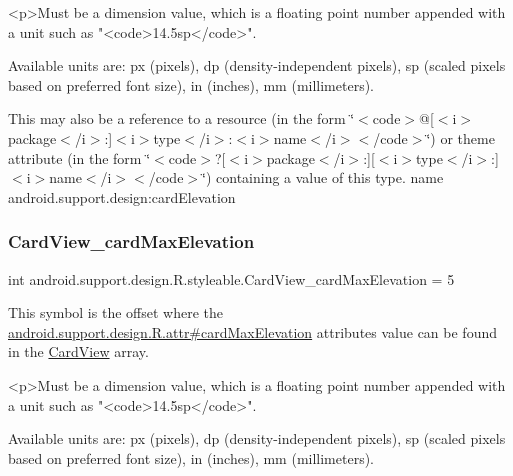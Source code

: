 \begin{DoxyVerb}      <p>Must be a dimension value, which is a floating point number appended with a unit such as "<code>14.5sp</code>".
\end{DoxyVerb}
 Available units are\+: px (pixels), dp (density-\/independent pixels), sp (scaled pixels based on preferred font size), in (inches), mm (millimeters). 

This may also be a reference to a resource (in the form \char`\"{}$<$code$>$@\mbox{[}$<$i$>$package$<$/i$>$\+:\mbox{]}$<$i$>$type$<$/i$>$\+:$<$i$>$name$<$/i$>$$<$/code$>$\char`\"{}) or theme attribute (in the form \char`\"{}$<$code$>$?\mbox{[}$<$i$>$package$<$/i$>$\+:\mbox{]}\mbox{[}$<$i$>$type$<$/i$>$\+:\mbox{]}$<$i$>$name$<$/i$>$$<$/code$>$\char`\"{}) containing a value of this type.  name android.\+support.\+design\+:card\+Elevation \mbox{\label{classandroid_1_1support_1_1design_1_1R_1_1styleable_ab9004c87f60e622b9d923cc5c6a6a276}} 
\subsubsection{\texorpdfstring{Card\+View\+\_\+card\+Max\+Elevation}{CardView\_cardMaxElevation}}
{\footnotesize\ttfamily int android.\+support.\+design.\+R.\+styleable.\+Card\+View\+\_\+card\+Max\+Elevation = 5\hspace{0.3cm}{\ttfamily [static]}}

This symbol is the offset where the \hyperlink{classandroid_1_1support_1_1design_1_1R_1_1attr_a4ab552f9212cc7ca0ffa111487bc3924}{android.\+support.\+design.\+R.\+attr\#card\+Max\+Elevation} attribute\textquotesingle{}s value can be found in the \hyperlink{classandroid_1_1support_1_1design_1_1R_1_1styleable_a56025691fb136d28dc5fce5a25d7c65e}{Card\+View} array.

\begin{DoxyVerb}      <p>Must be a dimension value, which is a floating point number appended with a unit such as "<code>14.5sp</code>".
\end{DoxyVerb}
 Available units are\+: px (pixels), dp (density-\/independent pixels), sp (scaled pixels based on preferred font size), in (inches), mm (millimeters). 

